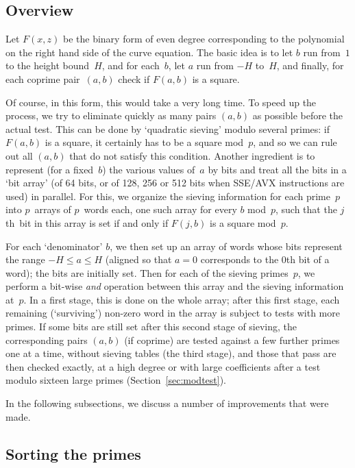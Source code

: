 \documentclass[12pt,a4paper,oneside]{amsart}
\begin{document}
\subsection{Overview}

Let $F(x, z)$ be the binary form of even degree corresponding to the
polynomial on the right hand side of the curve equation. The basic idea
is to let $b$ run from~$1$ to the height bound~$H$, and for each~$b$, let
$a$ run from $-H$ to~$H$, and finally, for each coprime pair~$(a,b)$ check
if $F(a, b)$ is a square.

Of course, in this form, this would take a very long time. To speed up the
process, we try to eliminate quickly as many pairs $(a, b)$ as possible
before the actual test. This can be done by `quadratic sieving' modulo
several primes: if $F(a, b)$ is a square, it certainly has to be a square
mod~$p$, and so we can rule out all $(a, b)$ that do not satisfy this
condition. Another ingredient is to represent (for a fixed~$b$) the
various values of~$a$ by bits and treat all the bits in a `bit array'
(of 64 bits, or of 128, 256 or 512 bits when SSE/AVX instructions are
used) in parallel. For this, we organize the sieving information for each
prime~$p$ into $p$~arrays of $p$~words each, one such array for every $b$
mod~$p$, such that the $j$th~bit in this array is set if and only if
$F(j, b)$ is a square mod~$p$.

For each `denominator' $b$, we then set up an array of words whose bits
represent the range \hbox{$-H \le a \le H$} (aligned so that $a = 0$ corresponds
to the $0$th bit of a word); the bits are initially set. Then for each
of the sieving primes~$p$, we perform a bit-wise {\em and} operation
between this array and the sieving information at~$p$. In a first stage,
this is done on the whole array; after this first stage, each remaining
(`surviving') non-zero word in the array is subject to tests with more
primes. If some bits are still set after this second stage of sieving,
the corresponding pairs $(a, b)$ (if coprime) are tested against a few
further primes one at a time, without sieving tables (the third stage),
and those that pass are then checked exactly, at a high degree or with
large coefficients after a test modulo sixteen large primes
(Section~\ref{sec:modtest}).

In the following subsections, we discuss a number of improvements that
were made.

\subsection{Sorting the primes}
\end{document}

